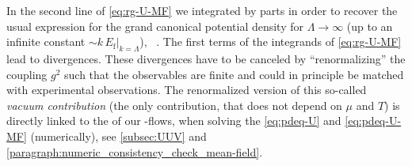 In the second line of \cref{eq:rg-U-MF} we integrated by parts in order to recover the usual expression for the grand canonical potential density for $\Lambda \rightarrow \infty$ (up to an infinite constant $\sim k \, E_\mathrm{f} \big|_{k = \Lambda}$), \cf{}\ .
The first terms of the integrands of \cref{eq:rg-U-MF} lead to divergences.
These divergences have to be canceled by ``renormalizing'' the coupling $g^2$ such that the \ir{} observables are finite and could in principle be matched with experimental observations.
The renormalized version of this so-called \textit{vacuum contribution} (the only contribution, that does not depend on $\mu$ and $T$) is directly linked to the \ic{} of our \frg{}-flows, when solving the \pde{} \eqref{eq:pdeq-U} and \ode{} \eqref{eq:pdeq-U-MF} (numerically), see \cref{subsec:UUV} and \cref{paragraph:numeric_consistency_check_mean-field}.
	
